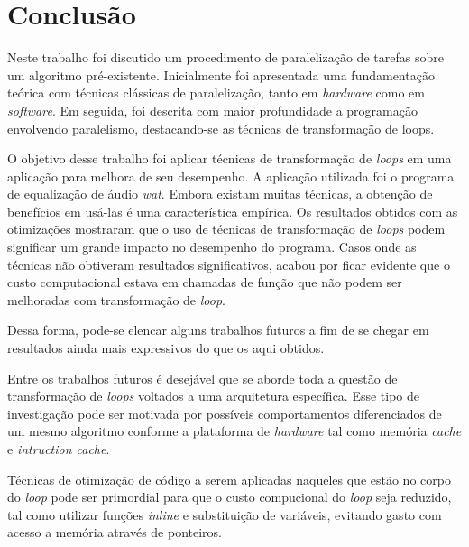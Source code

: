 \chapter{Conclusão}

Neste trabalho foi discutido um procedimento de paralelização de tarefas sobre 
um algoritmo pré-existente. 
Inicialmente foi apresentada uma fundamentação teórica com técnicas clássicas de 
paralelização, tanto em \textit{hardware} como em \textit{software}. 
Em seguida, foi descrita com maior profundidade a programação envolvendo 
paralelismo, destacando-se as técnicas de transformação de loops.

O objetivo desse trabalho foi aplicar técnicas de transformação de \textit{loops} 
em uma aplicação para melhora de seu desempenho. 
A aplicação utilizada foi o programa de equalização de áudio \textit{wat}. 
Embora existam muitas técnicas, a obtenção de benefícios em usá-las é uma 
característica empírica. 
Os resultados obtidos com as otimizações mostraram que o uso de técnicas de
transformação de \textit{loops} podem significar um grande impacto no desempenho
do programa.
Casos onde as técnicas não obtiveram resultados significativos, acabou por ficar
evidente que o custo computacional estava em chamadas de função que não podem
ser melhoradas com transformação de \textit{loop}.

Dessa forma, pode-se elencar alguns trabalhos futuros a fim de se chegar em 
resultados ainda mais expressivos do que os aqui obtidos. 

Entre os trabalhos futuros é desejável que se aborde toda a questão de 
transformação de \textit{loops} voltados a uma arquitetura específica. 
Esse tipo de investigação pode ser motivada por possíveis comportamentos 
diferenciados de um mesmo algoritmo conforme a plataforma de 
\textit{hardware} tal como memória \textit{cache} e \textit{intruction cache}.

Técnicas de otimização de código a serem aplicadas naqueles que estão no
corpo do \textit{loop} pode ser primordial para que o custo compucional do
\textit{loop} seja reduzido, tal como utilizar funções \textit{inline} e
substituição de variáveis, evitando gasto com acesso a memória através de
ponteiros.
